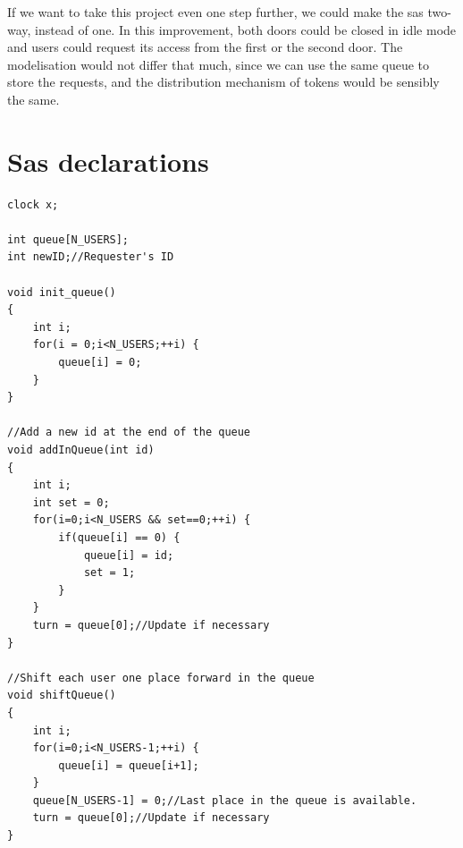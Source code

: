 \documentclass[10pt,a4paper]{article}
\begin{document}
If we want to take this project even one step further, we could make the sas two-way, instead of one.
In this improvement, both doors could be closed in idle mode and users could request its access from the first or the second door.
The modelisation would not differ that much, since we can use the same queue to store the requests, and the distribution mechanism of tokens would be sensibly the same.

\newpage
\appendix
\section{Sas declarations}
\begin{lstlisting}[caption=Sas model declarations., label=lst:sasDecl]
clock x;

int queue[N_USERS];
int newID;//Requester's ID

void init_queue()
{	
	int i;
	for(i = 0;i<N_USERS;++i) {
		queue[i] = 0;
	}
}

//Add a new id at the end of the queue
void addInQueue(int id) 
{
	int i;
	int set = 0;
	for(i=0;i<N_USERS && set==0;++i) {
		if(queue[i] == 0) {
			queue[i] = id;
			set = 1;
		}
	}
	turn = queue[0];//Update if necessary
}

//Shift each user one place forward in the queue
void shiftQueue()
{
	int i;
	for(i=0;i<N_USERS-1;++i) {
		queue[i] = queue[i+1];
	}
	queue[N_USERS-1] = 0;//Last place in the queue is available.
	turn = queue[0];//Update if necessary
}
\end{lstlisting}
\end{document}

